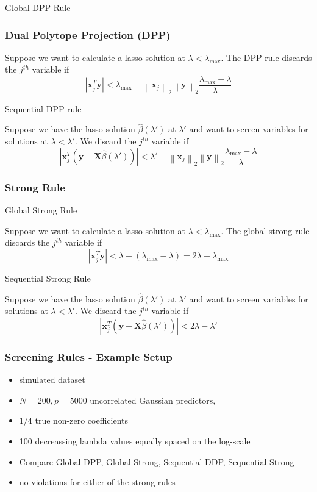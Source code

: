 \documentclass{beamer}
\newcommand{\Norm}[1]{\left\lVert#1\right\rVert}
\newcommand{\norm}[1]{\left\lvert#1\right\rvert}
\begin{document}
\begin{frame}

{\hspace{5pt}\Large Global DPP Rule}
\vspace{15pt}

\frametitle{Dual Polytope Projection (DPP)}
Suppose we want to calculate a lasso solution at $\lambda<\lambda_{\max}$. The DPP rule discards the $j^{th}$ variable if 
\[\norm{\mathbf{x}_j^T\mathbf{y}}<\lambda_{\max}-\Norm{\mathbf{x}_j}_2\Norm{\mathbf{y}}_2\frac{\lambda_{\max}-\lambda}{\lambda}\]

\vspace{5pt}
{\hspace{5pt}\Large Sequential DPP rule}
\vspace{15pt}

Suppose we have the lasso solution $\hat\beta(\lambda')$ at $\lambda'$ and want to screen variables for solutions at $\lambda<\lambda'$. We discard the $j^{th}$ variable if 
\[\norm{\mathbf{x}_j^T(\mathbf{y}-\mathbf{X}\hat{\beta}(\lambda'))}<\lambda'-\Norm{\mathbf{x}_j}_2\Norm{\mathbf{y}}_2\frac{\lambda_{\max}-\lambda}{\lambda}\]
\end{frame}

\begin{frame}
\frametitle{Strong Rule}

{\hspace{5pt}\Large Global Strong Rule}
\vspace{15pt}

Suppose we want to calculate a lasso solution at $\lambda<\lambda_{\max}$. The global strong rule discards the $j^{th}$ variable if 
\[\norm{\mathbf{x}_j^T\mathbf{y}}<\lambda-(\lambda_{\max}-\lambda)=2\lambda-\lambda_{\max}\]

\vspace{5pt}
{\hspace{5pt}\Large Sequential Strong Rule}
\vspace{15pt}

Suppose we have the lasso solution $\hat\beta(\lambda')$ at $\lambda'$ and want to screen variables for solutions at $\lambda<\lambda'$. We discard the $j^{th}$ variable if 
\[\norm{\mathbf{x}_j^T(\mathbf{y}-\mathbf{X}\hat{\beta}(\lambda'))}<2\lambda-\lambda'\]
\end{frame}

\begin{frame}
\frametitle{Screening Rules - Example Setup}

\begin{itemize}
	\item simulated dataset
	\item $N = 200, p = 5000$ uncorrelated Gaussian predictors, 
	\item $1/4$ true non-zero coefficients 
	\item 100 decreassing lambda values equally spaced on the log-scale
	\item Compare Global DPP, Global Strong, Sequential DDP, Sequential Strong
	\item no violations for either of the strong rules
\end{itemize}

\end{frame}
\end{document}

